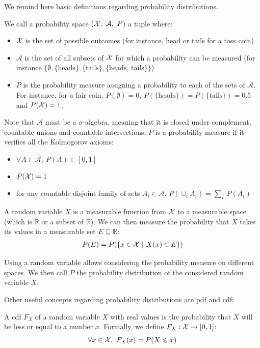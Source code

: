 We remind here basic definitions regarding probability distributions.

\begin{definition}\label{def:probability_space}
    We call a probability space $(\mathcal{X},~\mathcal{A},~P)$ a tuple where:
    \begin{itemize}
        \item $\mathcal{X}$ is the set of possible outcomes (for instance, head or tails for a toss coin)
        \item $\mathcal{A}$ is the set of all subsets of $\mathcal{X}$ for which a probability can be measured (for instance $\{\emptyset, \{\text{heads}\}, \{\text{tails}\}, \{\text{heads, tails}\}\}$)
        \item $P$ is the probability measure assigning a probability to each of the sets of $\mathcal{A}$. For instance, for a fair coin, $P(\emptyset)=0$, $P(\{\text{heads}\})=P(\{\text{tails}\})=0.5$ and $P(\mathcal{X})=1$.
    \end{itemize}
    Note that $\mathcal{A}$ must be a $\sigma$-algebra, meaning that it is closed under complement, countable unions and countable intersections. $P$ is a probability measure if it verifies all the Kolmogorov axioms:
    \begin{itemize}
        \item $\forall A\in\mathcal{A},~P(A)\in[0,1]$
        \item $P(\mathcal{X}) = 1$
        \item for any countable disjoint family of sets $A_i\in\mathcal{A}$, $P(\cup_i A_i)=\sum_i~P(A_i)$
    \end{itemize}
\end{definition}

\begin{definition}
    A random variable $X$ is a measurable function from $\mathcal{X}$ to a measurable space (which is $\mathbb{R}$ or a subset of $\mathbb{R}$). We can then measure the probability that $X$ takes its values in a measurable set $E\subseteq\mathbb{R}$:
    \begin{align*}
        P(E) = P(\{x\in\mathcal{X}~|~X(x)\in E\})
    \end{align*}
\end{definition}

Using a random variable allows considering the probability measure on different spaces. We then call $P$ the probability distribution of the considered random variable $X$.

Other useful concepts regarding probability distributions are \acrfull{pdf} and \acrfull{cdf}:
\begin{definition}\label{def:cdf}
    A \acrfull{cdf} $F_X$ of a random variable $X$ with real values is the probability that $X$ will be less or equal to a number $x$. Formally, we define $F_X:\mathcal{X}\rightarrow[0,1]$:
    \begin{equation*}
        \forall x\in\mathcal{X},~F_X(x)=P(X\leqslant x)
    \end{equation*}
\end{definition}

